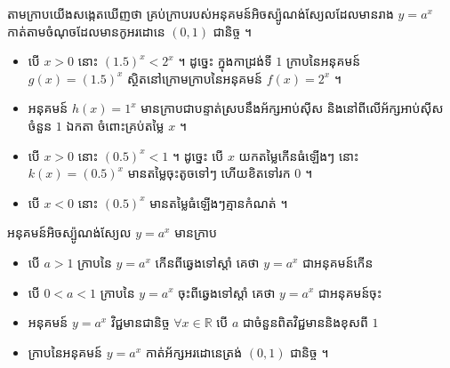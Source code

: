 តាមក្រាបយើងសង្កេតឃើញថា គ្រប់ក្រាបរបស់អនុគមន៍អិចស្ប៉ូណង់ស្យែលដែលមានរាង $y = a^x$ កាត់តាមចំណុចដែលមានកូអរដោនេ $(0, 1)$ ជានិច្ច ។
\begin{itemize}
  \item បើ $x > 0$ នោះ $(1.5)^x < 2^x$ ។ ដូច្នេះ ក្នុងកាដ្រង់ទី $1$ ក្រាបនៃអនុគមន៍ $g(x) = (1.5)^x$ ស្ថិតនៅក្រោមក្រាបនៃអនុគមន៍ $f(x) = 2^x$ ។
  \item អនុគមន៍ $h(x) = 1^x$ មានក្រាបជាបន្ទាត់ស្របនឹងអ័ក្សអាប់ស៊ីស និងនៅពីលើអ័ក្សអាប់ស៊ីសចំនួន $1$ ឯកតា ចំពោះគ្រប់តម្លៃ $x$ ។
  \item បើ $x > 0$ នោះ $(0.5)^x < 1$ ។ ដូច្នេះ បើ $x$ យកតម្លៃកើនធំឡើងៗ នោះ $k(x) = (0.5)^x$ មានតម្លៃចុះតូចទៅៗ ហើយខិតទៅរក $0$ ។
  \item បើ $x < 0$ នោះ $(0.5)^x$ មានតម្លៃធំឡើងៗគ្មានកំណត់ ។
\end{itemize}

\begin{formulaBox}[ជាទូទៅ]
អនុគមន៍អិចស្ប៉ូណង់ស្យែល $y = a^x$ មានក្រាប
\begin{itemize}
  \item បើ $a > 1$ ក្រាបនៃ $y = a^x$ កើនពីឆ្វេងទៅស្តាំ គេថា $y = a^x$ ជាអនុគមន៍កើន
  \item បើ $0 < a < 1$ ក្រាបនៃ $y = a^x$ ចុះពីឆ្វេងទៅស្តាំ គេថា $y = a^x$ ជាអនុគមន៍ចុះ
  \item អនុគមន៍ $y = a^x$ វិជ្ជមានជានិច្ច $\forall x \in \mathbb{R}$ បើ $a$ ជាចំនួនពិតវិជ្ជមាននិងខុសពី $1$
  \item ក្រាបនៃអនុគមន៍ $y = a^x$ កាត់អ័ក្សអរដោនេត្រង់ $(0, 1)$ ជានិច្ច ។
\end{itemize}
\end{formulaBox}

